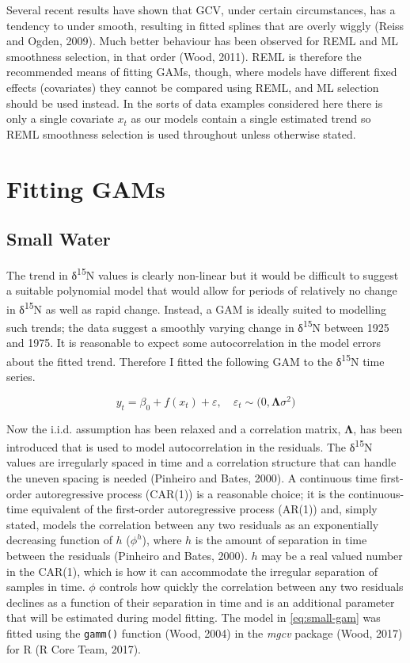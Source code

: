 \documentclass[12pt,]{article}
\begin{document}
Several recent results have shown that GCV, under certain circumstances,
has a tendency to under smooth, resulting in fitted splines that are
overly wiggly (Reiss and Ogden, 2009). Much better behaviour has been
observed for REML and ML smoothness selection, in that order (Wood,
2011). REML is therefore the recommended means of fitting GAMs, though,
where models have different fixed effects (covariates) they cannot be
compared using REML, and ML selection should be used instead. In the
sorts of data examples considered here there is only a single covariate
\(x_t\) as our models contain a single estimated trend so REML
smoothness selection is used throughout unless otherwise stated.

\section{Fitting GAMs}\label{fitting-gams}

\subsection{Small Water}\label{small-water}

The trend in δ\textsuperscript{15}N values is clearly non-linear but it
would be difficult to suggest a suitable polynomial model that would
allow for periods of relatively no change in δ\textsuperscript{15}N as
well as rapid change. Instead, a GAM is ideally suited to modelling such
trends; the data suggest a smoothly varying change in
δ\textsuperscript{15}N between 1925 and 1975. It is reasonable to expect
some autocorrelation in the model errors about the fitted trend.
Therefore I fitted the following GAM to the δ\textsuperscript{15}N time
series.

\begin{equation} \label{eq:small-gam}
y_t = \beta_0 + f(x_t) + \varepsilon, \quad \varepsilon_t \sim \mathcal(0, \boldsymbol{\Lambda}\sigma^2)
\end{equation}

Now the i.i.d. assumption has been relaxed and a correlation matrix,
\(\boldsymbol{\Lambda}\), has been introduced that is used to model
autocorrelation in the residuals. The δ\textsuperscript{15}N values are
irregularly spaced in time and a correlation structure that can handle
the uneven spacing is needed (Pinheiro and Bates, 2000). A continuous
time first-order autoregressive process (CAR(1)) is a reasonable choice;
it is the continuous-time equivalent of the first-order autoregressive
process (AR(1)) and, simply stated, models the correlation between any
two residuals as an exponentially decreasing function of \(h\)
(\(\phi^h\)), where \(h\) is the amount of separation in time between
the residuals (Pinheiro and Bates, 2000). \(h\) may be a real valued
number in the CAR(1), which is how it can accommodate the irregular
separation of samples in time. \(\phi\) controls how quickly the
correlation between any two residuals declines as a function of their
separation in time and is an additional parameter that will be estimated
during model fitting. The model in \eqref{eq:small-gam} was fitted using
the \texttt{gamm()} function (Wood, 2004) in the \emph{mgcv} package
(Wood, 2017) for R (R Core Team, 2017).
\end{document}
